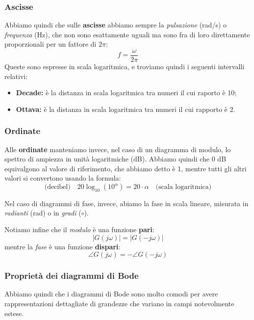 \documentclass[a4paper,11pt]{article}
\begin{document}
\subsubsection{Ascisse}
Abbiamo quindi che sulle \textbf{ascisse} abbiamo sempre la \textit{pulsazione} (rad/s) o \textit{frequenza} (Hz), che non sono esattamente uguali ma sono fra di loro direttamente proporzionali per un fattore di $2\pi$:
$$
f = \frac{\omega}{2\pi}
$$
Queste sono espresse in scala logaritmica, e troviamo quindi i seguenti intervalli relativi:
\begin{itemize}
	\item \textbf{Decade:} è la distanza in scala logaritmica tra numeri il cui raporto è 10;
	\item \textbf{Ottava:} è la distanza in scala logaritmica tra numeri il cui rapporto è 2.
\end{itemize}

\subsubsection{Ordinate}
Alle \textbf{ordinate} manteniamo invece, nel caso di un diagramma di modulo, lo spettro di ampiezza in unità logaritmiche (dB).
Abbiamo quindi che 0 dB equivalgono al valore di riferimento, che abbiamo detto è 1, mentre tutti gli altri valori si convertono usando la formula:
$$
\text{(decibel)} \quad 20 \log_{10}(10^\alpha) = 20 \cdot \alpha \quad \text{(scala logaritmica)}
$$

Nel caso di diagrammi di fase, invece, abiamo la fase in scala lineare, misurata in \textit{radianti} (rad) o in \textit{gradi} ($\circ$).

\par\medskip

Notiamo infine che il \textit{modulo} è una funzione \textbf{pari}:
$$
|G(j \omega)| = |G(-j \omega)|
$$
mentre la \textit{fase} è una funzione \textbf{dispari}:
$$
\angle G(j \omega) = - \angle G(-j \omega)
$$

\subsubsection{Proprietà dei diagrammi di Bode}
Abbiamo quindi che i diagrammi di Bode sono molto comodi per avere rappresentazioni dettagliate di grandezze che variano in campi notevolmente estese.
\end{document}
